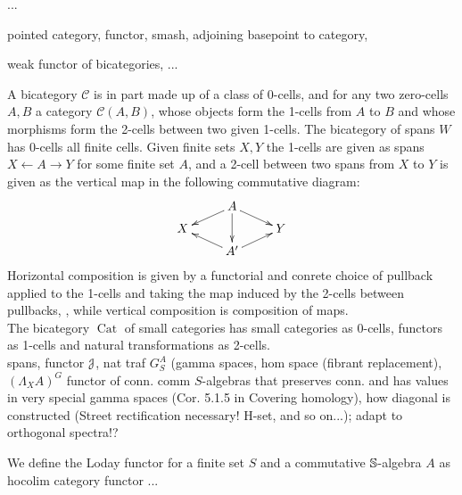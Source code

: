   \begin{defn}\label{def_functor_iW_to_Cat}
    ...
  \end{defn}

  \begin{defn}\label{def_pointed_stuff}
    pointed category, functor, smash, adjoining basepoint to category,
  \end{defn}

  \begin{defn}\label{def_added_basepoint_extending_functor}
    weak functor of bicategories, ...
  \end{defn}

  A bicategory $\mathcal{C}$ is in part made up of a class of 0-cells, and for any two zero-cells $A,B$ a category $\mathcal{C}(A,B)$, whose objects form the 1-cells from $A$ to $B$ and whose morphisms form the 2-cells between two given 1-cells. The bicategory of spans $W$ has 0-cells all finite cells. Given finite sets $X,Y$ the 1-cells are given as spans $ X \leftarrow A \rightarrow Y$ for some finite set $A$, and a 2-cell between two spans from $X$ to $Y$  is given as the vertical map in the following commutative diagram:
  \[
  \xymatrix@R-=.5em{
    &
    A \ar[dl] \ar[dd] \ar[dr]
    \\
    X
    &
    &
    Y
    \\
    &
    A^\prime \ar[ul] \ar[ur]
    &
  }
  \]
  Horizontal composition is given by a functorial and conrete choice of pullback applied to the 1-cells and taking the map induced by the 2-cells between pullbacks, , while vertical composition is composition of maps.\\
  The bicategory $\operatorname{Cat}$ of small categories has small categories as 0-cells, functors as 1-cells and natural transformations as 2-cells.
  \\
  spans, functor $\mathcal{J}$, nat traf $G^A_S$ (gamma spaces, hom space (fibrant replacement), $(\Lambda_X A)^G$ functor of conn. comm $S$-algebras that preserves conn. and has values in very special gamma spaces (Cor. 5.1.5 in Covering homology), how diagonal is constructed (Street rectification necessary! H-set, and so on...); adapt to orthogonal spectra!?
  \begin{defn}\label{def_loday_functor}
    We define the Loday functor for a finite set $S$ and a commutative $\mathbb{S}$-algebra $A$ as hocolim category functor ...

  \end{defn}

